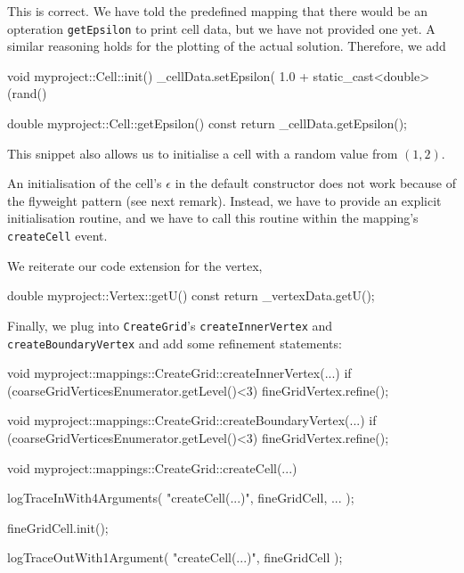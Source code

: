 \noindent
This is correct. 
We have told the predefined mapping that there would be an opteration
\texttt{getEpsilon} to print cell data, but we have not provided one yet.
A similar reasoning holds for the plotting of the actual solution.
Therefore, we add 

\begin{code}
void myproject::Cell::init() {
  _cellData.setEpsilon( 1.0 + static_cast<double>(rand() %
}

double myproject::Cell::getEpsilon() const {
  return _cellData.getEpsilon();
}
\end{code}

\noindent
This snippet also allows us to initialise a cell with a random value from
$(1,2)$.


\begin{remark}
An initialisation of the cell's $\epsilon$ in the default constructor does not
work because of the flyweight pattern (see next remark). Instead, we have to
provide an explicit initialisation routine, and we have to call this routine
within the mapping's \texttt{createCell} event.
\end{remark}

\noindent
We reiterate our code extension for the vertex,

\begin{code}
double myproject::Vertex::getU() const {
  return _vertexData.getU();
}
\end{code}

\noindent
Finally, we plug into \texttt{CreateGrid}'s \texttt{createInnerVertex} and
\texttt{createBoundaryVertex} and add some refinement statements:

\begin{code}
void myproject::mappings::CreateGrid::createInnerVertex(...) {
 if (coarseGridVerticesEnumerator.getLevel()<3) {
  fineGridVertex.refine();
 }
} 
 
void myproject::mappings::CreateGrid::createBoundaryVertex(...) {
 if (coarseGridVerticesEnumerator.getLevel()<3) {
  fineGridVertex.refine();
 }
} 
 
void myproject::mappings::CreateGrid::createCell(...) {
 logTraceInWith4Arguments( "createCell(...)", fineGridCell, ... );

 fineGridCell.init();

 logTraceOutWith1Argument( "createCell(...)", fineGridCell );
}
  
\end{code}

